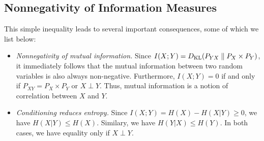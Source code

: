 \documentclass[12pt]{article}
\begin{document}
\subsection{Nonnegativity of Information Measures}
This simple inequality leads to several important consequences, some of which we list below: 
\begin{itemize}
\item  \emph{Nonnegativity of mutual information.} Since $I(X; Y) = D_{\text{KL}}(P_{YX} \parallel P_X \times P_Y)$, it immediately follows that the mutual information between two random variables is also always non-negative. Furthermore, $I(X;Y)=0$ if and only if $P_{XY} = P_X \times P_Y$ or $X \perp Y$. Thus, mutual information is a notion of correlation between $X$ and $Y$.

\item \emph{Conditioning reduces entropy.} Since $I(X;Y) = H(X) - H(X|Y) \geq 0$, we have $H(X|Y) \leq H(X)$. Similary, we have $H(Y|X) \leq H(Y)$. In both cases, we have equality only if $X \perp Y$. 
\end{itemize}
\end{document}
